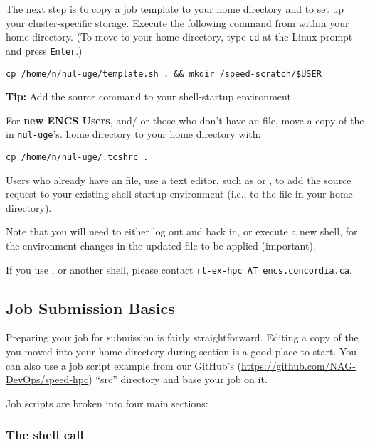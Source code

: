 \documentclass{easychair}
\begin{document}
The next step is to copy a job template to your home directory and to set up your
cluster-specific storage. Execute the following command from within your
home directory. (To move to your home directory, type \texttt{cd} at the Linux
prompt and press \texttt{Enter}.) 

\begin{verbatim}
cp /home/n/nul-uge/template.sh . && mkdir /speed-scratch/$USER
\end{verbatim}

\textbf{Tip:} Add the source command to your shell-startup environment. 

For \textbf{new ENCS Users}, and/ or those who don't have an  
file, move a copy of the  in \texttt{nul-uge}'s. home directory 
to your home directory with:

\begin{verbatim}
cp /home/n/nul-uge/.tcshrc . 
\end{verbatim}

Users who already have an  file, use a text editor, such as
  or , to add the source request to your existing
shell-startup environment (i.e., to the  file in your home directory). 

Note that you will need to either log out and back in, or execute a new shell, 
for the environment changes in the updated  file to be applied 
(important). 

If you use , or another shell, please contact 
\texttt{rt-ex-hpc AT encs.concordia.ca}.

\subsection{Job Submission Basics}

Preparing your job for submission is fairly straightforward. Editing a copy
of the  you moved into your home directory during section
 is a good place to start. You can also use a job script
example from our GitHub's (\url{https://github.com/NAG-DevOps/speed-hpc}) ``src'' 
directory and base your job on it.

Job scripts are broken into four main sections: 
\subsubsection{The shell call}
\end{document}
